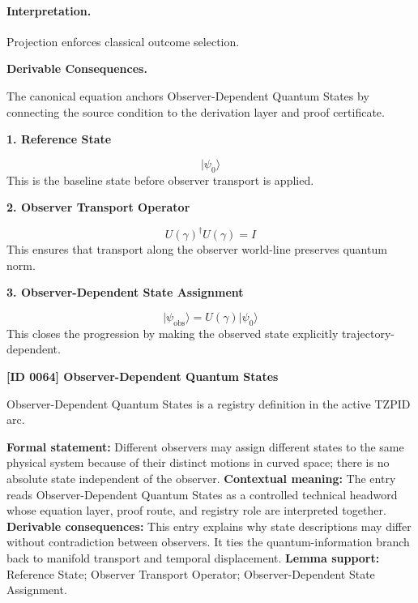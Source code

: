 \paragraph{Interpretation.}
Projection enforces classical outcome selection.

\par\vspace{0.35em}
\noindent\textbf{Derivable Consequences.}\quad
\begingroup
\footnotesize
\raggedright
The canonical equation anchors Observer-Dependent Quantum States by connecting the source condition to the derivation layer and proof certificate.
\par\endgroup

\noindent\textbf{1. Reference State}\par
\[
\lvert \psi_{0}\rangle
\]
\noindent This is the baseline state before observer transport is applied.\par
\noindent\textbf{2. Observer Transport Operator}\par
\[
U(\gamma)^{\dagger}U(\gamma) = I
\]
\noindent This ensures that transport along the observer world-line preserves quantum norm.\par
\noindent\textbf{3. Observer-Dependent State Assignment}\par
\[
\lvert \psi_{\mathrm{obs}}\rangle
=
U(\gamma)\lvert \psi_{0}\rangle
\]
\noindent This closes the progression by making the observed state explicitly trajectory-dependent.\par

\clearpage
\noindent\textbf{[ID 0064] Observer-Dependent Quantum States}\par
\vspace{0.35em}
\begingroup\small
{}
Observer-Dependent Quantum States is a registry definition in the active TZPID arc.

\begingroup\footnotesize\setlength{\emergencystretch}{3em}\sloppy
\textbf{Formal statement:} Different observers may assign different states to the same physical system because of their distinct motions in curved space; there is no absolute state independent of the observer. \textbf{Contextual meaning:} The entry reads Observer-Dependent Quantum States as a controlled technical headword whose equation layer, proof route, and registry role are interpreted together. \textbf{Derivable consequences:} This entry explains why state descriptions may differ without contradiction between observers. It ties the quantum-information branch back to manifold transport and temporal displacement. \textbf{Lemma support:} Reference State; Observer Transport Operator; Observer-Dependent State Assignment.\par
\endgroup

